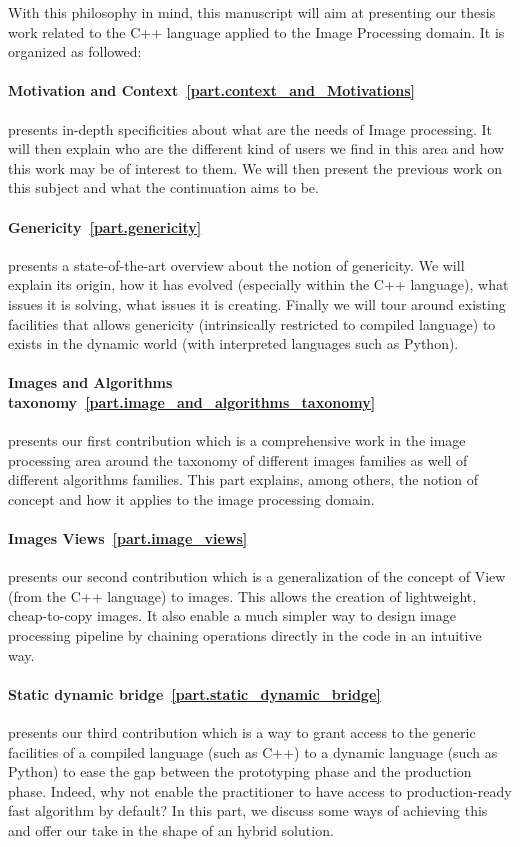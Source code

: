 With this philosophy in mind, this manuscript will aim at presenting our thesis work related to the C++ language applied
to the Image Processing domain. It is organized as followed:

\paragraph{Motivation and Context~\ref{part.context_and_Motivations}} presents in-depth specificities about what are the
needs of Image processing. It will then explain who are the different kind of users we find in this area and how this
work may be of interest to them. We will then present the previous work on this subject and what the continuation aims
to be.

\paragraph{Genericity~\ref{part.genericity}} presents a state-of-the-art overview about the notion of genericity. We
will explain its origin, how it has evolved (especially within the C++ language), what issues it is solving, what issues
it is creating. Finally we will tour around existing facilities that allows genericity (intrinsically restricted to
compiled language) to exists in the dynamic world (with interpreted languages such as Python).

\paragraph{Images and Algorithms taxonomy~\ref{part.image_and_algorithms_taxonomy}} presents our first contribution
which is a comprehensive work in the image processing area around the taxonomy of different images families as well of
different algorithms families. This part explains, among others, the notion of concept and how it applies to the
image processing domain.

\paragraph{Images Views~\ref{part.image_views}} presents our second contribution which is a generalization of the
concept of View (from the C++ language) to images. This allows the creation of lightweight, cheap-to-copy images. It
also enable a much simpler way to design image processing pipeline by chaining operations directly in the code in an
intuitive way.

\paragraph{Static dynamic bridge~\ref{part.static_dynamic_bridge}} presents our third contribution which is a way to
grant access to the generic facilities of a compiled language (such as C++) to a dynamic language (such as Python) to
ease the gap between the prototyping phase and the production phase. Indeed, why not enable the practitioner to have
access to production-ready fast algorithm by default? In this part, we discuss some ways of achieving this and offer our
take in the shape of an hybrid solution.
